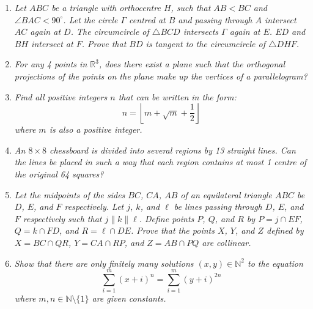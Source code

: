 \documentclass{article}
\begin{document}
\begin{enumerate}

\medskip
\item %
{\itshape Let $ABC$ be a triangle with orthocentre $H$, such that $AB<BC$ and $\angle BAC < 90^\circ$. Let the circle $\Gamma$ centred at $B$ and passing through $A$ intersect $AC$ again at $D$. The circumcircle of $\triangle BCD$ intersects $\Gamma$ again at $E$. $ED$ and $BH$ intersect at $F$. Prove that $BD$ is tangent to the circumcircle of $\triangle DHF$.
}


\medskip
\item %
{\itshape For any 4 points in $\mathbb{R}^3$, does there exist a plane such that the orthogonal projections of the points on the plane make up the vertices of a parallelogram?

}


\medskip
\item %
{\itshape Find all positive integers $n$ that can be written in the form:
$$n = \left\lfloor m + \sqrt{m} + \frac{1}{2} \right\rfloor$$
where $m$ is also a positive integer.}



\medskip
\item %
{\itshape An $8 \times 8$ chessboard is divided into several regions by 13 straight lines. Can the lines be placed in such a way that each region contains at most 1 centre of the original 64 squares?}




\medskip
\item %
{\itshape Let the midpoints of the sides $BC$, $CA$, $AB$ of an equilateral triangle $ABC$ be $D$, $E$, and $F$ respectively. Let $j$, $k$, and $\ell$ be lines passing through $D$, $E$, and $F$ respectively such that $j \parallel k \parallel \ell$. Define points $P$, $Q$, and $R$ by $P = j\cap EF$, $Q = k \cap FD$, and $R = \ell \cap DE$. Prove that the points $X$, $Y$, and $Z$ defined by $X = BC \cap QR$, $Y = CA \cap RP$, and $Z = AB \cap PQ$ are  collinear.}



\medskip
\item %
{\itshape Show that there are only finitely many solutions $(x, y) \in \mathbb{N}^2$ to the equation
$$\sum_{i = 1}^{m} (x + i)^n = \sum_{i = 1}^{m} (y + i)^{2n}$$
where $m, n \in \mathbb{N} \setminus \{1\}$ are given constants.}




\end{enumerate}
\end{document}
